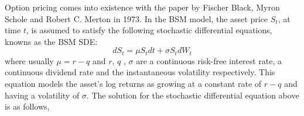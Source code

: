 Option pricing comes into existence with the paper by Fischer Black,  Myron Schole and Robert C. Merton in 1973. In the BSM model, the asset price $S_t$, at time $t$, is assumed to satisfy the following stochastic differential equations, knowns as the BSM SDE: 
\begin{equation} 
	dS_t= \mu S_tdt + \sigma S_t dW_t
	\label{BSModel}
\end{equation} 
where usually $\mu = r -q$ and $r$, $q$ , $\sigma$ are a continuous risk-free interest rate, a continuous dividend rate and the instantaneous volatility respectively. This equation models the asset’s log returns as growing at a constant rate of $r - q$ and having a volatility of $\sigma$. The solution for the stochastic differential equation above is as follows, 